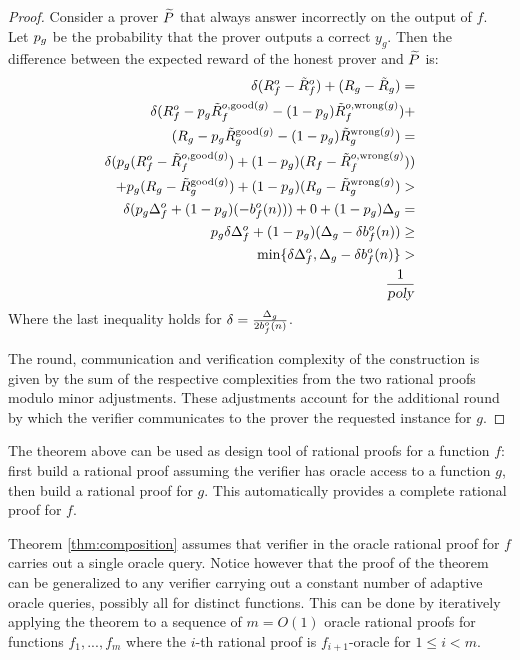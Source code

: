 \begin{proof}
Consider a prover $\widetilde{P}$ that always answer incorrectly on the output of $f$. 
Let $p_{g}$ be the probability that the prover outputs a correct $y_g$. %
Then the difference between the expected reward of the honest prover and $\widetilde{P}$ is:
\setcounter{equation}{0}
\begin{align}
 \delta(R_f^o - \tilde{R}_f^o) + (R_g - \tilde{R}_g)  = \\
 \delta(R_f^o - p_{g} \tilde{R}_f^{o,\text{good}(g)} - (1-p_{g})\tilde{R}_f^{o,\text{wrong}(g)}) + \nonumber  \\ (R_g - p_{g} \tilde{R}_g^{\text{good}(g)} - (1-p_{g})\tilde{R}_g^{\text{wrong}(g)})  = \\
 \delta(p_{g}(R_f^o - \tilde{R}_f^{o,\text{good}(g)}) + (1-p_{g})(R_f - \tilde{R}_f^{o,\text{wrong}(g)})) \nonumber \\ + p_{g}(R_g - \tilde{R}_g^{\text{good}(g)}) + (1-p_{g})(R_g-\tilde{R}_g^{\text{wrong}(g)})  > \\
 \delta(p_{g} \Delta^o_f + (1-p_{g})(-b^o_f(n))) + 0 + (1-p_{g})\Delta_g  = \\
 p_{g}\delta\Delta^o_f + (1-p_{g})(\Delta_g - \delta b^o_f(n))  \geq \\
 \min\{\delta \Delta^o_f, \Delta_g - \delta b^o_f(n) \}  > \\
\frac{1}{{\textsl{poly}}}
\end{align}
Where the last inequality holds for $\delta = \frac{\Delta_g}{2b^o_f(n)}$.

The round, communication and verification complexity of the construction is given by the sum of the respective complexities from the two rational proofs modulo minor adjustments. These adjustments account for the additional round by which the verifier communicates to the prover the requested instance for $g$. 

\begin{comment}
One final note: in the proof above we replaced the oracle query to $g$ with an invocation of the rational proof for it. In certain circumstances (see for example the proof of Theorem \ref{thm:crhf-p}), it would simplify a proof to assume that some of the messages of the rational proof for $g$ are sent before the protocol for $f$ is invoked.
The analysis above still holds if extending the rational proof for $f$ with such "preprocessing" messages still yields a $g$-oracle rational proof for $f$.
\end{comment}
\end{proof}

The theorem above can be used as design tool of rational proofs for a function $f$: first build a rational proof assuming the verifier has oracle access to a function $g$, then build a rational proof for $g$. This automatically provides a complete rational proof for $f$.

\begin{remark}
	Theorem \ref{thm:composition} assumes that verifier in the oracle rational proof for $f$ carries out a single oracle query. Notice however that the proof of the theorem can be generalized to any verifier carrying out a constant number of adaptive oracle queries, possibly all for distinct functions.
	This can be done by iteratively applying the theorem to a sequence of $m = O(1)$ oracle rational proofs for functions $f_1,...,f_m$ where the $i$-th rational proof is $f_{i+1}$-oracle for $1 \leq i < m$.
\end{remark}
